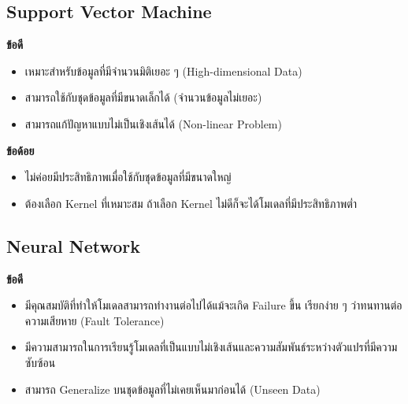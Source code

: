\subsection{Support Vector Machine}
\label{ssec:pros_cons_svm}

\noindent \textbf{ข้อดี}
%
\begin{itemize}[topsep=0pt,noitemsep]\setlength\itemsep{0.5em}
    \item เหมาะสำหรับข้อมูลที่มีจำนวนมิติเยอะ ๆ (High-dimensional Data)
    
    \item สามารถใช้กับชุดข้อมูลที่มีขนาดเล็กได้ (จำนวนข้อมูลไม่เยอะ)
    
    \item สามารถแก้ปัญหาแบบไม่เป็นเชิงเส้นได้ (Non-linear Problem)
\end{itemize}

\noindent \textbf{ข้อด้อย}
%
\begin{itemize}[topsep=0pt,noitemsep]\setlength\itemsep{0.5em}
    \item ไม่ค่อยมีประสิทธิภาพเมื่อใช้กับชุดข้อมูลที่มีขนาดใหญ่
    
    \item ต้องเลือก Kernel ที่เหมาะสม ถ้าเลือก Kernel ไม่ดีก็จะได้โมเดลที่มีประสิทธิภาพต่ำ
\end{itemize}

\subsection{Neural Network}
\label{ssec:pros_cons_nn}

\noindent \textbf{ข้อดี}
%
\begin{itemize}[topsep=0pt,noitemsep]\setlength\itemsep{0.5em}
    \item มีคุณสมบัติที่ทำให้โมเดลสามารถทำงานต่อไปได้แม้จะเกิด Failure ขึ้น เรียกง่าย ๆ ว่าทนทานต่อความเสียหาย (Fault Tolerance)

    \item มีความสามารถในการเรียนรู้โมเดลที่เป็นแบบไม่เชิงเส้นและความสัมพันธ์ระหว่างตัวแปรที่มีความซับซ้อน
    
    \item สามารถ Generalize บนชุดข้อมูลที่ไม่เคยเห็นมาก่อนได้ (Unseen Data)
\end{itemize}

